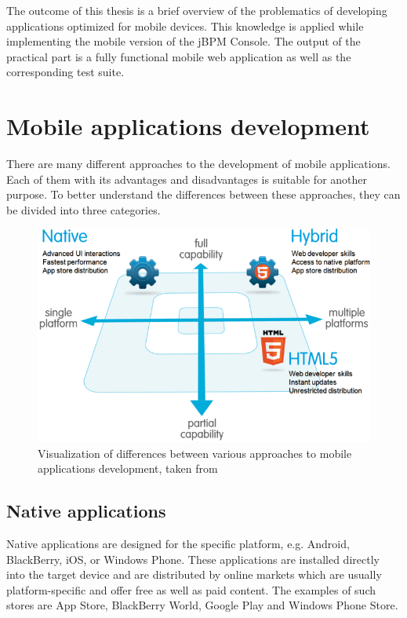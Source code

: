 \documentclass[12pt,oneside,final]{fithesis2}
\begin{document}
The outcome of this thesis is a brief overview of the problematics of developing applications optimized for mobile devices.
This knowledge is applied while implementing the mobile version of the jBPM Console.
The output of the practical part is a fully functional mobile web application as well as the corresponding test suite.

\chapter{Mobile applications development}
\label{chap:chapter2}
There are many different approaches to the development of mobile applications.
Each of them with its advantages and disadvantages is suitable for another purpose.
To better understand the differences between these approaches, they can be divided into three categories.

\begin{figure}[ht!]
\centering
\includegraphics[width=\textwidth]{images/native-html5-hybrid.png}
\caption{Visualization of differences between various approaches to mobile applications development, taken from \cite{developerforce}}
\label{fig:native-html5-hybrid}
\end{figure}

\section{Native applications}
Native applications are designed for the specific platform, e.g. Android, BlackBerry, iOS, or Windows Phone.
These applications are installed directly into the target device and are distributed by online markets which are usually platform-specific and offer free as well as paid content.
The examples of such stores are App Store\footnotemark{}, BlackBerry World\footnotemark{}, Google Play\footnotemark{} and Windows Phone Store\footnotemark{}.
\end{document}

